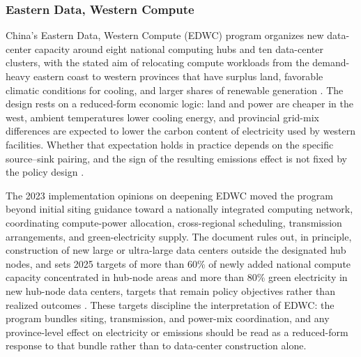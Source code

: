 \documentclass[12pt,a4paper]{article}
\begin{document}
\subsubsection{Eastern Data, Western Compute}
%
%

China's Eastern Data, Western Compute (EDWC) program organizes new
data-center capacity around eight national computing hubs and ten
data-center clusters, with the stated aim of relocating compute
workloads from the demand-heavy eastern coast to western provinces
that have surplus land, favorable climatic conditions for cooling,
and larger shares of renewable generation
\citep{xieetal-2024-greeningchinasdigital,zhangetal-2025-easterndatawestern}.
The design rests on a reduced-form economic logic: land and power are
cheaper in the west, ambient temperatures lower cooling energy, and
provincial grid-mix differences are expected to lower the carbon
content of electricity used by western facilities. Whether that
expectation holds in practice depends on the specific source--sink
pairing, and the sign of the resulting emissions effect is not fixed
by the policy design \citep{zhangetal-2025-decarbonizingdatacenters}.

The 2023 implementation opinions on deepening EDWC moved the program
beyond initial siting guidance toward a nationally integrated computing
network, coordinating compute-power allocation, cross-regional
scheduling, transmission arrangements, and green-electricity supply.
The document rules out, in principle, construction of new large or
ultra-large data centers outside the designated hub nodes, and sets
2025 targets of more than 60\% of newly added national compute
capacity concentrated in hub-node areas and more than 80\% green
electricity in new hub-node data centers, targets that remain policy
objectives rather than realized outcomes
\citep{nationaldevelopmentandreformcommission-2023-guanyushenrushishidongshuxisuangongchengjiakuaigoujianquanguoyitihuasuanliwangdeshishiyijian}.
These targets discipline the interpretation of EDWC: the program
bundles siting, transmission, and power-mix coordination, and any
province-level effect on electricity or emissions should be read as a
reduced-form response to that bundle rather than to data-center
construction alone.
\end{document}
